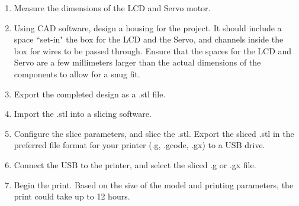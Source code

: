 \documentclass[titlepage]{article}
\begin{document}
\begin{enumerate}
\subsection*{3D Printing (Optional)}
    \item Measure the dimensions of the LCD and Servo motor. 
    \item Using CAD software, design a housing for the project. It should include a space ``set-in" the box for the LCD and the Servo, and channels inside the box for wires to be passed through. Ensure that the spaces for the LCD and Servo are a few millimeters larger than the actual dimensions of the components to allow for a snug fit. 
    \item Export the completed design as a .stl file. 
    \item Import the .stl into a slicing software.
    \item Configure the slice parameters, and slice the .stl. Export the sliced .stl in the preferred file format for your printer (.g, .gcode, .gx) to a USB drive. 
    \item Connect the USB to the printer, and select the sliced .g or .gx file. 
    \item Begin the print. Based on the size of the model and printing parameters, the print could take up to 12 hours.

\end{enumerate}
\end{document}
